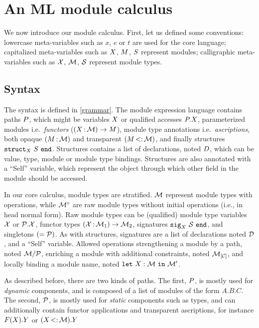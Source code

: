 \section{An ML module calculus}

We now introduce our module calculus.
First, let us defined some conventions:
lowercase meta-variables such as $x$, $e$ or $t$ are used for the core language;
capitalized meta-variables such as $X$, $M$, $S$ represent modules;
calligraphic meta-variables such as $\mathcal X$, $\mathcal M$, $\mathcal S$ represent module types.

\subsection{Syntax}

The syntax is defined in \cref{grammar}.
The module expression language contains paths $P$, which might
be variables $X$ or qualified accesses $P.X$,
parameterized modules i.e.~\emph{functors} ($(X \operatorname{:} \mathcal M) \to M$),
module type annotations i.e.~\emph{ascriptions}, both
opaque $(M \operatorname{:} \mathcal M)$ and transparent $(M \operatorname{<:} \mathcal M)$,
and finally structures $\mathtt{struct}_{X}\ S\ \mathtt{end}$. Structures
contains a list of declarations, noted $D$, which can be value, type, module or module type bindings. Structures are also annotated with a ``Self'' variable,
which represent the object through which
other field in the module should be accessed.

In our core calculus, module types are stratified. $\mathcal M$ represent module
types with operations, while ${\mathcal M^\circ}$ are raw module types without initial operations
(i.e., in head normal form). Raw module types can be (qualified)
module type variables $\mathcal X$ or $\mathcal P.\mathcal X$, functor types
$(\mathcal X \operatorname{:} \mathcal M_1) \to \mathcal M_2$, signatures $\mathtt{sig}_{X}\ \mathcal S\ \mathtt{end}$,
and singletons $(= \mathcal P)$.
As with structures, signatures are a list of declarations noted $\mathcal D$, and
a ``Self'' variable.
Allowed operations strengthening a module by a path,
noted $\mathcal M/\mathcal P$,
enriching a module with additional constraints, noted ${\mathcal M}_{\left[\mathcal C\right]}$,
and locally binding a module name, noted $\mathtt{let}\ X : \mathcal M\ \mathtt{in}\ \mathcal M'$.

As described before, there are two kinds of paths.
The first, $P$, is
mostly used for \emph{dynamic} components, and is composed of a list of
modules of the form $A.B.C$.
The second, $\mathcal P$, is mostly used for \emph{static} components such as types,
and can additionally contain functor applications and transparent ascriptions,
for instance $F(X).Y$ or $(X \operatorname{<:} \mathcal M).Y$

